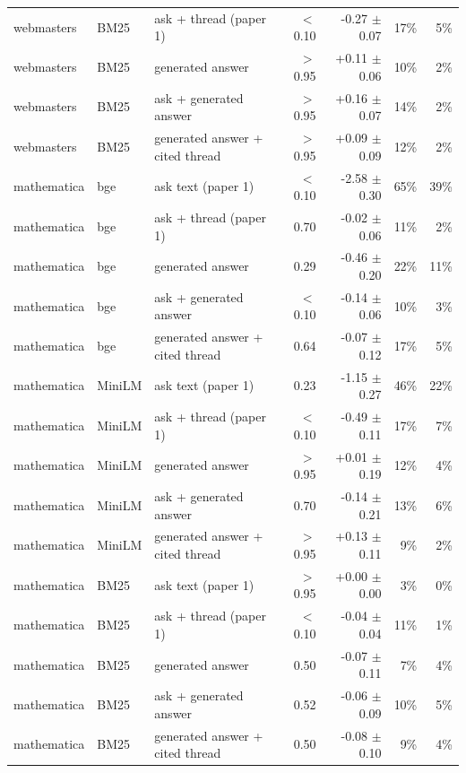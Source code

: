 \begin{tabular}{lllrrrr}
webmasters & BM25 & ask + thread (paper 1) & $<$0.10 & -0.27 $\pm$ 0.07 & 17\% & 5\% \\
webmasters & BM25 & generated answer & $>$0.95 & +0.11 $\pm$ 0.06 & 10\% & 2\% \\
webmasters & BM25 & ask + generated answer & $>$0.95 & +0.16 $\pm$ 0.07 & 14\% & 2\% \\
webmasters & BM25 & generated answer + cited thread & $>$0.95 & +0.09 $\pm$ 0.09 & 12\% & 2\% \\
\midrule
mathematica & bge & ask text (paper 1) & $<$0.10 & -2.58 $\pm$ 0.30 & 65\% & 39\% \\
mathematica & bge & ask + thread (paper 1) & 0.70 & -0.02 $\pm$ 0.06 & 11\% & 2\% \\
mathematica & bge & generated answer & 0.29 & -0.46 $\pm$ 0.20 & 22\% & 11\% \\
mathematica & bge & ask + generated answer & $<$0.10 & -0.14 $\pm$ 0.06 & 10\% & 3\% \\
mathematica & bge & generated answer + cited thread & 0.64 & -0.07 $\pm$ 0.12 & 17\% & 5\% \\
\midrule
mathematica & MiniLM & ask text (paper 1) & 0.23 & -1.15 $\pm$ 0.27 & 46\% & 22\% \\
mathematica & MiniLM & ask + thread (paper 1) & $<$0.10 & -0.49 $\pm$ 0.11 & 17\% & 7\% \\
mathematica & MiniLM & generated answer & $>$0.95 & +0.01 $\pm$ 0.19 & 12\% & 4\% \\
mathematica & MiniLM & ask + generated answer & 0.70 & -0.14 $\pm$ 0.21 & 13\% & 6\% \\
mathematica & MiniLM & generated answer + cited thread & $>$0.95 & +0.13 $\pm$ 0.11 & 9\% & 2\% \\
\midrule
mathematica & BM25 & ask text (paper 1) & $>$0.95 & +0.00 $\pm$ 0.00 & 3\% & 0\% \\
mathematica & BM25 & ask + thread (paper 1) & $<$0.10 & -0.04 $\pm$ 0.04 & 11\% & 1\% \\
mathematica & BM25 & generated answer & 0.50 & -0.07 $\pm$ 0.11 & 7\% & 4\% \\
mathematica & BM25 & ask + generated answer & 0.52 & -0.06 $\pm$ 0.09 & 10\% & 5\% \\
mathematica & BM25 & generated answer + cited thread & 0.50 & -0.08 $\pm$ 0.10 & 9\% & 4\% \\
\bottomrule
\end{tabular}
